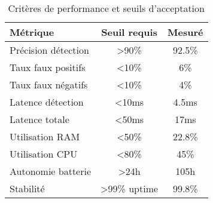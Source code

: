 \begin{table}[h]
\centering
\caption{Critères de performance et seuils d'acceptation}
\begin{tabular}{lcc}
\toprule
\textbf{Métrique} & \textbf{Seuil requis} & \textbf{Mesuré} \\
\midrule
Précision détection & >90\% & 92.5\% \\
Taux faux positifs & <10\% & 6\% \\
Taux faux négatifs & <10\% & 4\% \\
Latence détection & <10ms & 4.5ms \\
Latence totale & <50ms & 17ms \\
Utilisation RAM & <50\% & 22.8\% \\
Utilisation CPU & <80\% & 45\% \\
Autonomie batterie & >24h & 105h \\
Stabilité & >99\% uptime & 99.8\% \\
\bottomrule
\end{tabular}
\end{table}